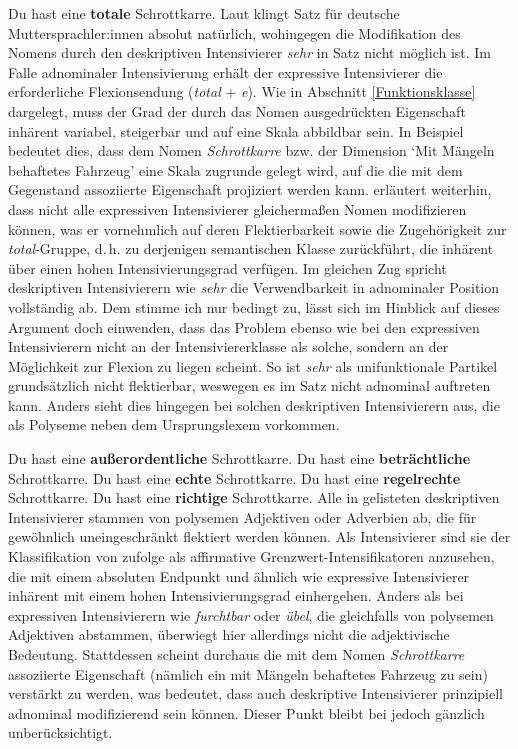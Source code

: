 \ea  \label{Schrott}
\ea Du hast eine \textbf{totale} Schrottkarre. \label{total}
 \z
 \z
Laut \citet[20]{Gutzmann.2019a} klingt Satz  für deutsche Muttersprachler:innen absolut natürlich, wohingegen die Modifikation des Nomens durch den deskriptiven Intensivierer \textit{sehr} in Satz  nicht möglich ist. Im Falle adnominaler Intensivierung erhält der expressive Intensivierer die erforderliche Flexionsendung (\textit{total} + \textit{e}). Wie in Abschnitt \ref{Funktionsklasse} dargelegt, muss der Grad der durch das Nomen ausgedrückten Eigenschaft inhärent variabel, steigerbar und auf eine Skala abbildbar sein. In {Beispiel } bedeutet dies, dass dem Nomen \textit{Schrottkarre} bzw. der Dimension `Mit Mängeln behaftetes Fahrzeug' eine Skala zugrunde gelegt wird, auf die die mit dem Gegenstand assoziierte Eigenschaft projiziert werden kann. {\citet[140ff.]{Gutzmann.2019a}} erläutert weiterhin, dass nicht alle expressiven Intensivierer gleichermaßen Nomen modifizieren können, was er vornehmlich auf deren Flektierbarkeit sowie die Zugehörigkeit zur \textit{total}-Gruppe, d.\,h. zu derjenigen semantischen Klasse zurückführt, die inhärent über einen hohen Intensivierungsgrad verfügen. Im gleichen Zug spricht {\citet[20]{Gutzmann.2019a}} deskriptiven Intensivierern wie \textit{sehr} die Verwendbarkeit in adnominaler Position vollständig ab. Dem stimme ich nur bedingt zu, lässt sich im Hinblick auf dieses Argument doch einwenden, dass das Problem ebenso wie bei den expressiven Intensivierern nicht an der Intensiviererklasse als solche, sondern an der Möglichkeit zur Flexion zu liegen scheint. So ist \textit{sehr} als unifunktionale Partikel grundsätzlich nicht flektierbar, weswegen es im Satz nicht adnominal auftreten kann. Anders sieht dies hingegen bei solchen deskriptiven Intensivierern aus, die als Polyseme neben dem Ursprungslexem vorkommen.

\ea  \label{Schrott3}
\ea Du hast eine \textbf{außerordentliche} Schrottkarre.
\ex Du hast eine \textbf{beträchtliche} Schrottkarre.
\ex Du hast eine \textbf{echte} Schrottkarre.
\ex Du hast eine \textbf{regelrechte} Schrottkarre.
\ex Du hast eine \textbf{richtige} Schrottkarre.
 \z
 \z
Alle in  gelisteten deskriptiven Intensivierer stammen von polysemen Adjektiven oder Adverbien ab, die für gewöhnlich uneingeschränkt flektiert werden können. Als Intensivierer sind sie der Klassifikation von {\citet[408]{Breindl.2007}} zufolge als affirmative Grenzwert-Intensifikatoren anzusehen, die mit einem absoluten Endpunkt und ähnlich wie expressive Intensivierer inhärent mit einem hohen Intensivierungsgrad einhergehen. Anders als bei expressiven Intensivierern wie \textit{furchtbar} oder \textit{übel}, die gleichfalls von polysemen Adjektiven abstammen, überwiegt hier allerdings nicht die adjektivische Bedeutung. Stattdessen scheint durchaus die mit dem Nomen \textit{Schrottkarre} assoziierte Eigenschaft (nämlich ein mit Mängeln behaftetes Fahrzeug zu sein) verstärkt zu werden, was bedeutet, dass auch deskriptive Intensivierer prinzipiell adnominal modifizierend sein können. Dieser Punkt bleibt bei {\citet[]{Gutzmann.2019a}} jedoch gänzlich unberücksichtigt.

